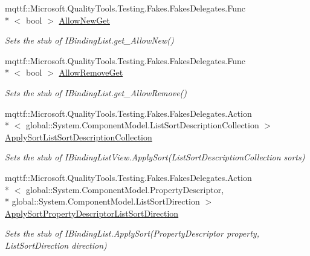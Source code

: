 \begin{DoxyCompactItemize}
mqttf\-::\-Microsoft.\-Quality\-Tools.\-Testing.\-Fakes.\-Fakes\-Delegates.\-Func\\*
$<$ bool $>$ \hyperlink{class_system_1_1_component_model_1_1_fakes_1_1_stub_i_binding_list_view_a12df093a702953ba5b5a44bff553bc69}{Allow\-New\-Get}
\begin{DoxyCompactList}\small\item\em Sets the stub of I\-Binding\-List.\-get\-\_\-\-Allow\-New()\end{DoxyCompactList}\item 
mqttf\-::\-Microsoft.\-Quality\-Tools.\-Testing.\-Fakes.\-Fakes\-Delegates.\-Func\\*
$<$ bool $>$ \hyperlink{class_system_1_1_component_model_1_1_fakes_1_1_stub_i_binding_list_view_a13ee963153f73177a19d0f383f988c80}{Allow\-Remove\-Get}
\begin{DoxyCompactList}\small\item\em Sets the stub of I\-Binding\-List.\-get\-\_\-\-Allow\-Remove()\end{DoxyCompactList}\item 
mqttf\-::\-Microsoft.\-Quality\-Tools.\-Testing.\-Fakes.\-Fakes\-Delegates.\-Action\\*
$<$ global\-::\-System.\-Component\-Model.\-List\-Sort\-Description\-Collection $>$ \hyperlink{class_system_1_1_component_model_1_1_fakes_1_1_stub_i_binding_list_view_a2490012b836d44f0e39e5cafc8017cd8}{Apply\-Sort\-List\-Sort\-Description\-Collection}
\begin{DoxyCompactList}\small\item\em Sets the stub of I\-Binding\-List\-View.\-Apply\-Sort(\-List\-Sort\-Description\-Collection sorts)\end{DoxyCompactList}\item 
mqttf\-::\-Microsoft.\-Quality\-Tools.\-Testing.\-Fakes.\-Fakes\-Delegates.\-Action\\*
$<$ global\-::\-System.\-Component\-Model.\-Property\-Descriptor, \\*
global\-::\-System.\-Component\-Model.\-List\-Sort\-Direction $>$ \hyperlink{class_system_1_1_component_model_1_1_fakes_1_1_stub_i_binding_list_view_ab681995d5f0e99d9f7ebb194bcc15fd1}{Apply\-Sort\-Property\-Descriptor\-List\-Sort\-Direction}
\begin{DoxyCompactList}\small\item\em Sets the stub of I\-Binding\-List.\-Apply\-Sort(\-Property\-Descriptor property, List\-Sort\-Direction direction)\end{DoxyCompactList}\item 

\end{DoxyCompactItemize}
